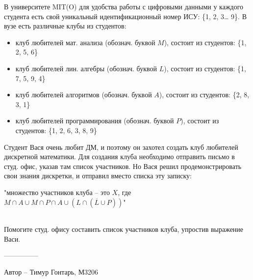 \question
В университете MIT(O) для удобства работы с цифровыми данными у каждого студента есть свой уникальный идентификационный номер ИСУ: \{1, 2, 3… 9\}. В вузе есть различные клубы из студентов:
\begin{itemize}
    \item клуб любителей мат. анализа (обознач. буквой $M$), состоит из студентов: \{1, 2, 5, 6\}
    \item клуб любителей лин. алгебры (обознач. буквой $L$), состоит из студентов: \{1, 7, 5, 9, 4\}
    \item клуб любителей алгоритмов (обознач. буквой $A$), состоит из студентов: \{2, 8, 3, 1\}
    \item клуб любителей программирования (обознач. буквой $P$), состоит из студентов: \{1, 2, 6, 3, 8, 9\}
\end{itemize}
Студент Вася очень любит ДМ, и поэтому он захотел создать клуб любителей дискретной математики. Для создания клуба необходимо отправить письмо в студ. офис, указав там список участников. Но Вася решил продемонстрировать свои знания дискретки, и отправил вместо списка эту записку:
\begin{center}
"множество участников клуба -- это $X$, где $M \cap A \cup M \cap P \cap A \cup (L \cap (\overline{L} \cup P))$"
\end{center}
\\
Помогите студ. офису составить список участников клуба, упростив выражение Васи.

---------------

Автор -- Тимур Гонтарь, М3206